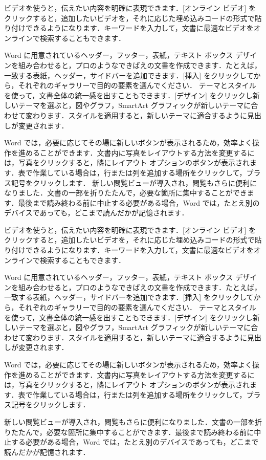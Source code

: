 ビデオを使うと，伝えたい内容を明確に表現できます．[オンライン ビデオ] をクリックすると，追加したいビデオを，それに応じた埋め込みコードの形式で貼り付けできるようになります．キーワードを入力して，文書に最適なビデオをオンラインで検索することもできます．

Word に用意されているヘッダー，フッター，表紙，テキスト ボックス デザインを組み合わせると，プロのようなできばえの文書を作成できます．たとえば，一致する表紙，ヘッダー，サイドバーを追加できます．[挿入] をクリックしてから，それぞれのギャラリーで目的の要素を選んでください．
テーマとスタイルを使って，文書全体の統一感を出すこともできます．[デザイン] をクリックし新しいテーマを選ぶと，図やグラフ，SmartArt グラフィックが新しいテーマに合わせて変わります．スタイルを適用すると，新しいテーマに適合するように見出しが変更されます．

Word では，必要に応じてその場に新しいボタンが表示されるため，効率よく操作を進めることができます．文書内に写真をレイアウトする方法を変更するには，写真をクリックすると，隣にレイアウト オプションのボタンが表示されます．表で作業している場合は，行または列を追加する場所をクリックして，プラス記号をクリックします．
新しい閲覧ビューが導入され，閲覧もさらに便利になりました．文書の一部を折りたたんで，必要な箇所に集中することができます．最後まで読み終わる前に中止する必要がある場合，Word では，たとえ別のデバイスであっても，どこまで読んだかが記憶されます．

ビデオを使うと，伝えたい内容を明確に表現できます．[オンライン ビデオ] をクリックすると，追加したいビデオを，それに応じた埋め込みコードの形式で貼り付けできるようになります．キーワードを入力して，文書に最適なビデオをオンラインで検索することもできます．

Word に用意されているヘッダー，フッター，表紙，テキスト ボックス デザインを組み合わせると，プロのようなできばえの文書を作成できます．たとえば，一致する表紙，ヘッダー，サイドバーを追加できます．[挿入] をクリックしてから，それぞれのギャラリーで目的の要素を選んでください．
テーマとスタイルを使って，文書全体の統一感を出すこともできます．[デザイン] をクリックし新しいテーマを選ぶと，図やグラフ，SmartArt グラフィックが新しいテーマに合わせて変わります．スタイルを適用すると，新しいテーマに適合するように見出しが変更されます．

Word では，必要に応じてその場に新しいボタンが表示されるため，効率よく操作を進めることができます．文書内に写真をレイアウトする方法を変更するには，写真をクリックすると，隣にレイアウト オプションのボタンが表示されます．表で作業している場合は，行または列を追加する場所をクリックして，プラス記号をクリックします．

新しい閲覧ビューが導入され，閲覧もさらに便利になりました．文書の一部を折りたたんで，必要な箇所に集中することができます．最後まで読み終わる前に中止する必要がある場合，Word では，たとえ別のデバイスであっても，どこまで読んだかが記憶されます．
